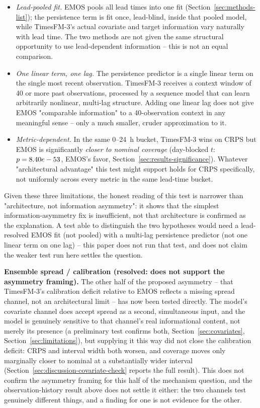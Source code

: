 \begin{itemize}
\item \emph{Lead-pooled fit.} EMOS pools all \NLeadTimes{} lead times
into one fit (Section~\ref{sec:methods-list}); the persistence term is
fit once, lead-blind, inside that pooled model, while TimesFM-3's actual
covariate and target information vary naturally with lead time. The two
methods are not given the same structural opportunity to use
lead-dependent information -- this is not an equal comparison.
\item \emph{One linear term, one lag.} The persistence predictor is a
single linear term on the single most recent observation. TimesFM-3
receives a context window of 40 or more past observations, processed by
a sequence model that can learn arbitrarily nonlinear, multi-lag
structure. Adding one linear lag does not give EMOS "comparable
information" to a 40-observation context in any meaningful sense --
only a much smaller, cruder approximation to it.
\item \emph{Metric-dependent.} In the same 0--24~h bucket, TimesFM-3
wins on CRPS but EMOS is significantly \emph{closer to nominal coverage}
(day-blocked \(t\): \(p=8.40e-53\), EMOS's favor,
Section~\ref{sec:results-significance}). Whatever "architectural
advantage" this test might support holds for CRPS specifically, not
uniformly across every metric in the same lead-time bucket.
\end{itemize}

Given these three limitations, the honest reading of this test is
narrower than "architecture, not information asymmetry": it shows that
the simplest information-asymmetry fix is insufficient, not that
architecture is confirmed as the explanation. A test able to distinguish
the two hypotheses would need a lead-resolved EMOS fit (not pooled) with
a multi-lag persistence predictor (not one linear term on one lag) --
this paper does not run that test, and does not claim the weaker test
run here settles the question.

\textbf{Ensemble spread / calibration (resolved: does not support the
asymmetry framing).} The other half of the proposed asymmetry -- that
TimesFM-3's calibration deficit relative to EMOS reflects a missing
spread channel, not an architectural limit -- has now been tested
directly. The model's covariate channel does accept spread as a second,
simultaneous input, and the model is genuinely sensitive to that
channel's real informational content, not merely its presence (a
preliminary test confirms both, Section~\ref{sec:covariates},
Section~\ref{sec:limitations}), but supplying it this way did not close
the calibration deficit: CRPS and interval width both worsen, and
coverage moves only marginally closer to nominal at a substantially
wider interval (Section~\ref{sec:discussion-covariate-check} reports the
full result). This does not confirm the asymmetry framing for this half
of the mechanism question, and the observation-history result above does
not settle it either: the two channels test genuinely different things,
and a finding for one is not evidence for the other.

